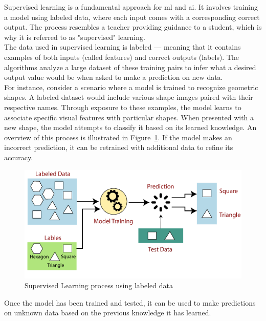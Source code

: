 Supervised learning is a fundamental approach for \gls{ml} and \gls{ai}. It involves training a model using labeled data, where each input comes with a corresponding correct output. The process resembles a teacher providing guidance to a student, which is why it is referred to as "supervised" learning. \cite{geeksforgeeks:supervised-learning} \\

The data used in supervised learning is labeled — meaning that it contains examples of both inputs (called features) and correct outputs (labels). The algorithms analyze a large dataset of these training pairs to infer what a desired output value would be when asked to make a prediction on new data. \cite{google:supervised-learning} \\

For instance, consider a scenario where a model is trained to recognize geometric shapes. A labeled dataset would include various shape images paired with their respective names. Through exposure to these examples, the model learns to associate specific visual features with particular shapes. When presented with a new shape, the model attempts to classify it based on its learned knowledge. An overview of this process is illustrated in Figure~\ref{fig:supervised-learning}. If the model makes an incorrect prediction, it can be retrained with additional data to refine its accuracy. \cite{google:supervised-learning} \\

\begin{figure}[h!]
    \centering
    \includegraphics[width=0.75\linewidth]{figures/theory/supervised-learning.png}
    \caption[Supervised Learning process using labeled data]{Supervised Learning process using labeled data \cite{tpointtech:supervised-learning}}
    \label{fig:supervised-learning}
\end{figure}

\newpage

Once the model has been trained and tested, it can be used to make predictions on unknown data based on the previous knowledge it has learned. \cite{google:supervised-learning}

